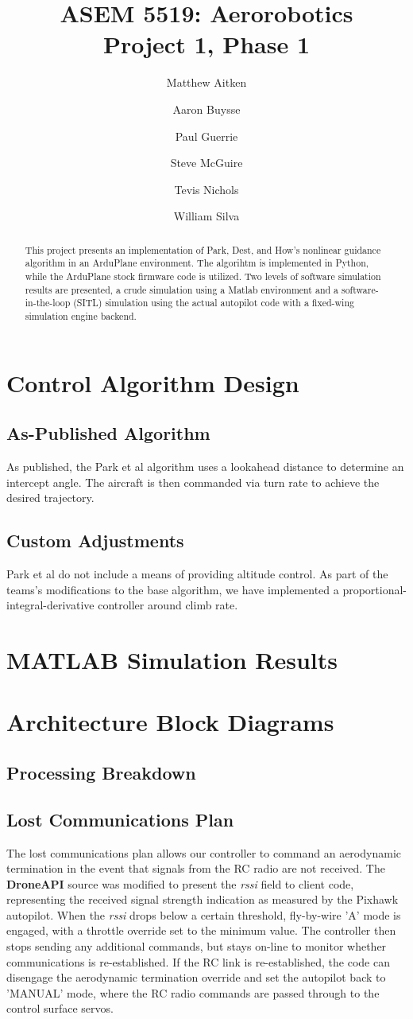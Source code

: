\documentclass{aiaa}
\title{ASEM 5519: Aerorobotics \\ Project 1, Phase 1}
\author{Matthew Aitken \and Aaron Buysse \and Paul Guerrie \and Steve McGuire
\and Tevis Nichols \and William Silva}
\begin{document}
\maketitle
\begin{abstract}
This project presents an implementation of Park, Dest, and How's nonlinear guidance algorithm in an ArduPlane environment. The algorihtm is implemented in Python, while the ArduPlane stock firmware code is utilized. Two levels of software simulation results are presented, a crude simulation using a Matlab environment and a software-in-the-loop (SITL) simulation using the actual autopilot code with a fixed-wing simulation engine backend.
\end{abstract}

\section{Control Algorithm Design}
\subsection{As-Published Algorithm}
As published, the Park et al algorithm uses a lookahead distance to determine an intercept angle. The aircraft is then commanded via turn rate to achieve the desired trajectory.
\subsection{Custom Adjustments}
Park et al do not include a means of providing altitude control. As part of the teams's modifications to the base algorithm, we have implemented a proportional-integral-derivative controller around climb rate.  
\section{MATLAB Simulation Results}
\section{Architecture Block Diagrams}
\subsection{Processing Breakdown}
\subsection{Lost Communications Plan}
The lost communications plan allows our controller to command an aerodynamic termination in the event that signals from the RC radio are not received. The \textbf{DroneAPI} source was modified to present the \textit{rssi} field to client code, representing the received signal strength indication as measured by the Pixhawk autopilot. When the \textit{rssi} drops below a certain threshold, fly-by-wire 'A' mode is engaged, with a throttle override set to the minimum value. The controller then stops sending any additional commands, but stays on-line to monitor whether communications is re-established. If the RC link is re-established, the code can disengage the aerodynamic termination override and set the autopilot back to 'MANUAL' mode, where the RC radio commands are passed through to the control surface servos.
\end{document}
